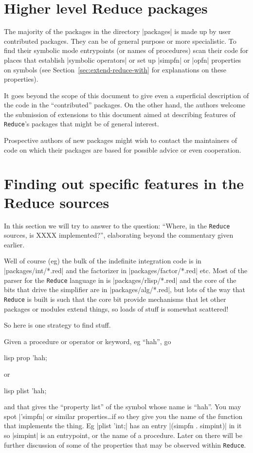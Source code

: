 \documentclass[12pt,twoside,openright]{memoir}
\newcommand{\reduce}{\texttt{Reduce}\xspace}
\begin{document}
\section{Higher level Reduce packages}

The majority of the packages in the directory |packages| is made up by user
contributed packages. They can be of general purpose or more specialistic.
To find their symbolic mode entrypoints (or names of procedures) scan their
code for places that establish |symbolic operators| or set up |simpfn| or
|opfn| properties on symbols (see Section~\ref{sec:extend-reduce-with} for
explanations on these properties).

It goes beyond the scope of this document to give even a superficial
description of the code in the ``contributed'' packages. On the other hand,
the authors welcome the submission of extensions to this document aimed at describing
features of \reduce's packages that might be of general interest.

Prospective authors of new packages might wish to contact the maintainers of
code on which their packages are based for possible advice or even cooperation.

\section{Finding out specific features in the Reduce sources}

In this section we will try to answer to the question:
``Where, in the \reduce sources, is XXXX implemented?'', elaborating
beyond the commentary given earlier.

Well of course (eg) the bulk of the indefinite integration code is in
|packages/int/*.red| and the factorizer in |packages/factor/*.red| etc.  Most
of the parser for the \reduce language in is |packages/rlisp/*.red| and the core
of the bits that drive the simplifier are in |packages/alg/*.red|, but lots of
the way that \reduce is built is such that the core bit provide mechanisms that
let other packages or modules extend things, so loads of stuff is somewhat
scattered!

So here is one strategy to find stuff.

Given a procedure or operator or keyword, eg ``hah'', go
\begin{rlispverb}
  lisp prop 'hah; %
\end{rlispverb}
or
\begin{rlispverb}
  lisp plist 'hah; %
\end{rlispverb}
and that gives the ``property list'' of the symbol whose name is ``hah''. You
may spot |'simpfn| or similar properties\dots if so they give you the name of
the function that implements the thing. Eg |plist 'int;| has an entry
|(simpfn . simpint)| in it so |simpint| is an entrypoint, or the name of a
procedure. Later on there will be further discussion of some of the
properties that may be observed within \reduce.
\end{document}
